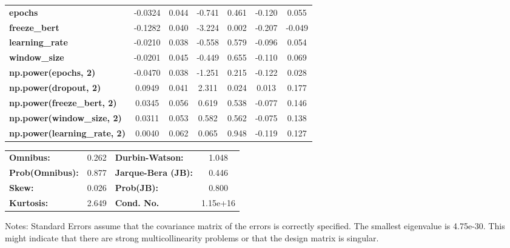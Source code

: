 \begin{center}
\begin{tabular}{lcccccc}
\textbf{epochs}                            &      -0.0324  &        0.044     &    -0.741  &         0.461        &       -0.120    &        0.055     \\
\textbf{freeze\_bert}                      &      -0.1282  &        0.040     &    -3.224  &         0.002        &       -0.207    &       -0.049     \\
\textbf{learning\_rate}                    &      -0.0210  &        0.038     &    -0.558  &         0.579        &       -0.096    &        0.054     \\
\textbf{window\_size}                      &      -0.0201  &        0.045     &    -0.449  &         0.655        &       -0.110    &        0.069     \\
\textbf{np.power(epochs, 2)}               &      -0.0470  &        0.038     &    -1.251  &         0.215        &       -0.122    &        0.028     \\
\textbf{np.power(dropout, 2)}              &       0.0949  &        0.041     &     2.311  &         0.024        &        0.013    &        0.177     \\
\textbf{np.power(freeze\_bert, 2)}         &       0.0345  &        0.056     &     0.619  &         0.538        &       -0.077    &        0.146     \\
\textbf{np.power(window\_size, 2)}         &       0.0311  &        0.053     &     0.582  &         0.562        &       -0.075    &        0.138     \\
\textbf{np.power(learning\_rate, 2)}       &       0.0040  &        0.062     &     0.065  &         0.948        &       -0.119    &        0.127     \\
\bottomrule
\end{tabular}
\begin{tabular}{lclc}
\textbf{Omnibus:}       &  0.262 & \textbf{  Durbin-Watson:     } &    1.048  \\
\textbf{Prob(Omnibus):} &  0.877 & \textbf{  Jarque-Bera (JB):  } &    0.446  \\
\textbf{Skew:}          &  0.026 & \textbf{  Prob(JB):          } &    0.800  \\
\textbf{Kurtosis:}      &  2.649 & \textbf{  Cond. No.          } & 1.15e+16  \\
\bottomrule
\end{tabular}
\end{center}

Notes: \newline
 [1] Standard Errors assume that the covariance matrix of the errors is correctly specified. \newline
 [2] The smallest eigenvalue is 4.75e-30. This might indicate that there are \newline
 strong multicollinearity problems or that the design matrix is singular.